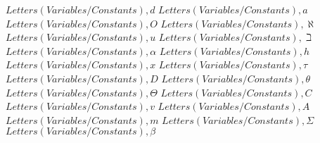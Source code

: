 \documentclass{article}
\begin{document}
$Letters (Variables/Constants),d$
\linebreak
\linebreak
$Letters (Variables/Constants),a$
\linebreak
\linebreak
$Letters (Variables/Constants),O$
\linebreak
\linebreak
$Letters (Variables/Constants),\aleph$
\linebreak
\linebreak
$Letters (Variables/Constants),u$
\linebreak
\linebreak
$Letters (Variables/Constants),\beth$
\linebreak
\linebreak
$Letters (Variables/Constants),\alpha$
\linebreak
\linebreak
$Letters (Variables/Constants),h$
\linebreak
\linebreak
$Letters (Variables/Constants),x$
\linebreak
\linebreak
$Letters (Variables/Constants),\tau$
\linebreak
\linebreak
$Letters (Variables/Constants),D$
\linebreak
\linebreak
$Letters (Variables/Constants),\theta$
\linebreak
\linebreak
$Letters (Variables/Constants),\Theta$
\linebreak
\linebreak
$Letters (Variables/Constants),C$
\linebreak
\linebreak
$Letters (Variables/Constants),v$
\linebreak
\linebreak
$Letters (Variables/Constants),A$
\linebreak
\linebreak
$Letters (Variables/Constants),m$
\linebreak
\linebreak
$Letters (Variables/Constants),\Sigma$
\linebreak
\linebreak
$Letters (Variables/Constants),\beta$
\linebreak
\linebreak
\end{document}
